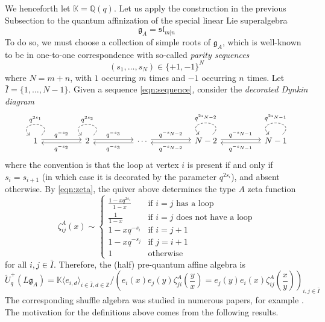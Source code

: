 \documentclass{amsart}
\def\fg{{\mathfrak{g}}}
\def\fsl{{\mathfrak{sl}}}
\def\BK{{\mathbb{K}}}
\def\BQ{{\mathbb{Q}}}
\def\BZ{{\mathbb{Z}}}
\def\tua{\widetilde{U}_q^+(L\fg_A)}
\begin{document}
We henceforth let $\BK = \BQ(q)$. Let us apply the construction in the previous Subsection to the quantum affinization of the special linear Lie superalgebra
\[
\fg_A = \fsl_{m|n}
\]
To do so, we must choose a collection of simple roots of $\fg_A$, which is well-known to be in one-to-one correspondence with so-called \emph{parity sequences}
\begin{equation}
\label{eqn:sequence}
(s_1,\dots,s_N) \in \{+1,-1\}^N
\end{equation}
where $N = m+n$, with $1$ occurring $m$ times and $-1$ occurring $n$ times. Let $\bar{I} = \{1,\dots,N-1\}$. Given a sequence \eqref{eqn:sequence}, consider the \emph{decorated Dynkin diagram}
\begin{equation}
\label{eqn:dynkin a}
\begin{tikzcd}
1 && 2 && \cdots && {N-2} && {N-1}
\arrow["q^{-s_{N-1}}", shift left=2pt, from=1-9, to=1-7]
\arrow["q^{-s_{N-1}}", shift left=2pt, from=1-7, to=1-9]
\arrow["q^{-s_{N-2}}", shift left=2pt, from=1-7, to=1-5]
\arrow["q^{-s_{N-2}}", shift left=2pt, from=1-5, to=1-7]
\arrow["q^{-s_3}", shift left=2pt, from=1-5, to=1-3]
\arrow["q^{-s_3}", shift left=2pt, from=1-3, to=1-5]
\arrow["q^{-s_2}", shift left=2pt, from=1-3, to=1-1]
\arrow["q^{-s_2}", shift left=2pt, from=1-1, to=1-3]
\arrow["q^{2s_{N-1}}"', dashed, from=1-9, to=1-9, looseness=4]
\arrow["q^{2s_{N-2}}"', dashed, from=1-7, to=1-7, looseness=4]
\arrow["q^{2s_2}"', dashed, from=1-3, to=1-3, looseness=4.5]
\arrow["q^{2s_1}"', dashed, from=1-1, to=1-1, looseness=4.5]
\end{tikzcd}
\end{equation}
where the convention is that the loop at vertex $i$ is present if and only if $s_i = s_{i+1}$ (in which case it is decorated by the parameter $q^{2s_i}$), and absent otherwise. By \eqref{eqn:zeta}, the quiver above determines the type $A$ zeta function
\begin{equation} 
\label{eqn:zeta a}
\zeta^{A}_{ij}(x) \sim
\begin{cases} 
\frac {1-xq^{2s_i}}{1-x} &\text{if } i = j \text{ has a loop} \\ 
\frac {1}{1-x} &\text{if } i = j \text{ does not have a loop} \\ 
1-xq^{-s_i} &\text{if } i = j+1 \\ 
1-xq^{-s_j} &\text{if } j = i+1 \\ 
1 &\text{otherwise} 
\end{cases} 
\end{equation}
for all $i,j \in \bar{I}$. Therefore, the (half) pre-quantum affine algebra is
\begin{equation}
\label{eqn:quadratic a}
\tua = \BK \langle e_{i,d} \rangle_{i \in \bar{I}, d\in \BZ} \Big/ \left(e_i(x)e_j(y) \zeta^{A}_{ji}\left(\frac yx\right) = e_j(y) e_i(x) \zeta^{A}_{ij}\left(\frac xy\right) \right)_{i,j \in \bar{I}}
\end{equation}
The corresponding shuffle algebra was studied in numerous papers, for example \cite{FJM, T}. The motivation for the definitions above comes from the following results.
\end{document}
